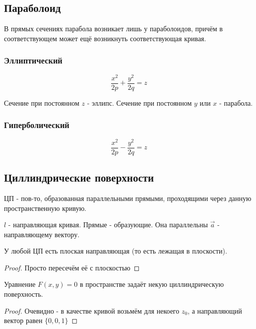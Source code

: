 \documentclass[12pt, a4paper]{article}
\begin{document}
    \subsection{Параболоид}

    \begin{note}
        В прямых сечениях парабола возникает лишь у параболоидов, 
        причём в соответствующем может ещё возникнуть 
        соответствующая кривая.
    \end{note}

    \subsubsection{Эллиптический}

    \begin{equation}
        \frac{x^2}{2p} + \frac{y^2}{2q} = z
    \end{equation}

    Сечение при постоянном $z$ - эллипс.
    Сечение при постоянном $y$ или $x$ - парабола.

    \subsubsection{Гиперболический}
    \begin{equation}
        \frac{x^2}{2p} - \frac{y^2}{2q} = z
    \end{equation}


    \subsection{Циллиндрические поверхности}

    \begin{definition}
        ЦП - пов-то, образованная параллельными прямыми, проходящими через данную пространственную кривую.
    \end{definition}

    $l$ - направляющая кривая.
    Прямые - образующие.
    Она параллельны $\vec{a}$ - направляющему вектору.

    \begin{theorem}
        У любой ЦП есть плоская направляющая (то есть лежащая в плоскости).
    \end{theorem}
    \begin{proof}
        Просто пересечём её с плоскостью
    \end{proof}

    \begin{theorem}
        Уравнение $F(x, y) = 0$ в пространстве задаёт некую циллиндрическую поверхность.
    \end{theorem}
    \begin{proof}
        Очевидно - в качестве кривой возьмём для некоего $z_0$, а направляющий вектор равен $\{ 0, 0, 1 \}$
    \end{proof}
\end{document}
